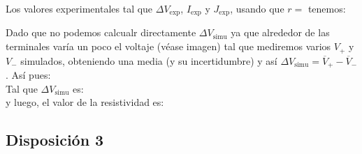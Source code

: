 \documentclass[11pt]{article}
\newcommand{\simu}{\text{simu}}
\begin{document}
Los valores experimentales tal que $\Delta V_{\exp}$, $I_{\exp}$ y $J_{\exp}$, usando que $r=$ tenemos: 



Dado que no podemos calcualr directamente $\Delta V_{\simu}$ ya que alrededor de las terminales varía un poco el voltaje (véase imagen) tal que mediremos varios $V_+$ y $V_-$ simulados, obteniendo una media (y su incertidumbre) y así $\Delta V_{\simu} = \overline{V}_+ - \overline{V}_{-} $. Así pues: \\[1em]

Tal que $\Delta V_{\simu}$ es: \\[1em]

y luego, el valor de la resistividad es:

\newpage

\subsection{Disposición 3}
\end{document}
